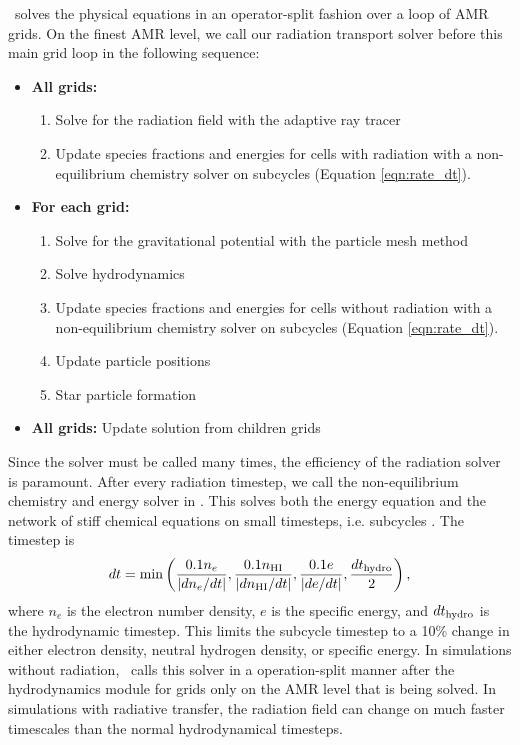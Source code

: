 \documentclass[useAMS,usenatbib,a4paper]{mn2e}
\begin{document}
\enzo~solves the physical equations in an operator-split fashion over
a loop of AMR grids.  On the finest AMR level, we call our radiation
transport solver before this main grid loop in the following sequence:
\begin{itemize}
\item \textbf{All grids:}
  \begin{enumerate}
  \item Solve for the radiation field with the adaptive ray tracer
  \item Update species fractions and energies for cells with radiation
    with a non-equilibrium chemistry solver on subcycles (Equation
    \ref{eqn:rate_dt}).
  \end{enumerate}
\item \textbf{For each grid:}
  \begin{enumerate}
  \item Solve for the gravitational potential with the particle mesh
    method
  \item Solve hydrodynamics
  \item Update species fractions and energies for cells without
    radiation with a non-equilibrium chemistry solver on subcycles
    (Equation \ref{eqn:rate_dt}).
  \item Update particle positions
  \item Star particle formation
  \end{enumerate}
\item \textbf{All grids:} Update solution from children grids
\end{itemize}
%

Since the solver must be called many times, the efficiency of the
radiation solver is paramount.  After every radiation timestep, we
call the non-equilibrium chemistry and energy solver in \enzo.  This
solves both the energy equation and the network of stiff chemical
equations on small timesteps, i.e. subcycles \citep{Anninos97}.  The
timestep is
%
\begin{equation}
  \label{eqn:rate_dt}
  dt = \min\left(
    \frac{0.1n_e}{|dn_e/dt|}, 
    \frac{0.1n_{\rm HI}}{|dn_{\rm HI}/dt|}, 
    \frac{0.1e}{|de/dt|}, 
    \frac{dt_{\rm hydro}}{2}\right),
\end{equation}
where $n_e$ is the electron number density, $e$ is the specific
energy, and $dt_{\rm hydro}$ is the hydrodynamic timestep.  This
limits the subcycle timestep to a 10\% change in either electron
density, neutral hydrogen density, or specific energy.  In simulations
without radiation, \enzo~calls this solver in a operation-split manner
after the hydrodynamics module for grids only on the AMR level that is
being solved.  In simulations with radiative transfer, the radiation
field can change on much faster timescales than the normal
hydrodynamical timesteps.
\end{document}
